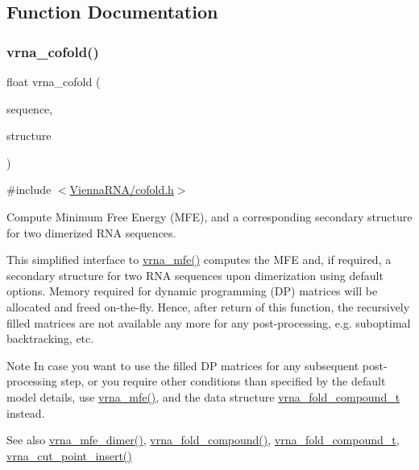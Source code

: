 \subsection{Function Documentation}
\mbox{\label{group__mfe__cofold_ga9ef3a297201dbf838a8daff2b45c0c82}} 
\subsubsection{\texorpdfstring{vrna\+\_\+cofold()}{vrna\_cofold()}}
{\footnotesize\ttfamily float vrna\+\_\+cofold (\begin{DoxyParamCaption}\item[{const char $\ast$}]{sequence,  }\item[{char $\ast$}]{structure }\end{DoxyParamCaption})}



{\ttfamily \#include $<$\mbox{\hyperlink{cofold_8h}{Vienna\+R\+N\+A/cofold.\+h}}$>$}



Compute Minimum Free Energy (M\+FE), and a corresponding secondary structure for two dimerized R\+NA sequences. 

This simplified interface to \mbox{\hyperlink{group__mfe__fold_gabd3b147371ccf25c577f88bbbaf159fd}{vrna\+\_\+mfe()}} computes the M\+FE and, if required, a secondary structure for two R\+NA sequences upon dimerization using default options. Memory required for dynamic programming (DP) matrices will be allocated and free\textquotesingle{}d on-\/the-\/fly. Hence, after return of this function, the recursively filled matrices are not available any more for any post-\/processing, e.\+g. suboptimal backtracking, etc.

\begin{DoxyNote}{Note}
In case you want to use the filled DP matrices for any subsequent post-\/processing step, or you require other conditions than specified by the default model details, use \mbox{\hyperlink{group__mfe__fold_gabd3b147371ccf25c577f88bbbaf159fd}{vrna\+\_\+mfe()}}, and the data structure \mbox{\hyperlink{group__fold__compound_ga1b0cef17fd40466cef5968eaeeff6166}{vrna\+\_\+fold\+\_\+compound\+\_\+t}} instead.
\end{DoxyNote}
\begin{DoxySeeAlso}{See also}
\mbox{\hyperlink{group__mfe__cofold_gaab22d10c1190f205f16a77cab9d5d3ee}{vrna\+\_\+mfe\+\_\+dimer()}}, \mbox{\hyperlink{group__fold__compound_ga6601d994ba32b11511b36f68b08403be}{vrna\+\_\+fold\+\_\+compound()}}, \mbox{\hyperlink{group__fold__compound_ga1b0cef17fd40466cef5968eaeeff6166}{vrna\+\_\+fold\+\_\+compound\+\_\+t}}, \mbox{\hyperlink{group__string__utils_ga74f05ece32ea73b59f84a7452afd5fae}{vrna\+\_\+cut\+\_\+point\+\_\+insert()}}
\end{DoxySeeAlso}

